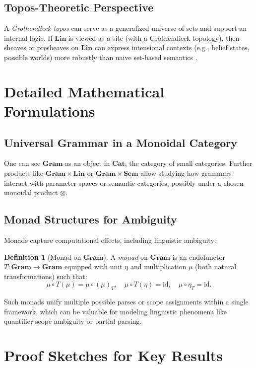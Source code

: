 \documentclass[12pt]{article}
\theoremstyle{plain}
\theoremstyle{definition}
\newtheorem{definition}[theorem]{Definition}
\begin{document}
\subsection{Topos-Theoretic Perspective}
A \emph{Grothendieck topos} can serve as a generalized universe of sets and support an internal logic. If \(\mathbf{Lin}\) is viewed as a site (with a Grothendieck topology), then sheaves or presheaves on \(\mathbf{Lin}\) can express intensional contexts (e.g., belief states, possible worlds) more robustly than naive set-based semantics \cite{Awodey}.

\section{Detailed Mathematical Formulations}

\subsection{Universal Grammar in a Monoidal Category}
One can see \(\mathbf{Gram}\) as an object in \(\mathbf{Cat}\), the category of small categories. Further products like \(\mathbf{Gram} \times \mathbf{Lin}\) or \(\mathbf{Gram} \times \mathbf{Sem}\) allow studying how grammars interact with parameter spaces or semantic categories, possibly under a chosen monoidal product \(\otimes\).

\subsection{Monad Structures for Ambiguity}
Monads capture computational effects, including linguistic ambiguity:

\begin{definition}[Monad on \texorpdfstring{$\mathbf{Gram}$}{Gram}]
A \emph{monad} on \(\mathbf{Gram}\) is an endofunctor \(T : \mathbf{Gram} \to \mathbf{Gram}\) equipped with unit \(\eta\) and multiplication \(\mu\) (both natural transformations) such that:
\[
\mu \circ T(\mu) = \mu \circ (\mu)_T, \quad
\mu \circ T(\eta) = \mathrm{id}, \quad
\mu \circ \eta_T = \mathrm{id}.
\]
\end{definition}

Such monads unify multiple possible parses or scope assignments within a single framework, which can be valuable for modeling linguistic phenomena like quantifier scope ambiguity or partial parsing.

\section{Proof Sketches for Key Results}
\end{document}
